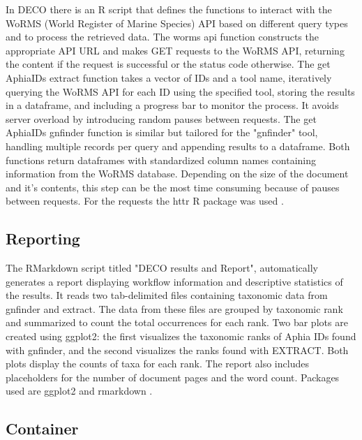 In DECO there is an R script that defines the functions to interact with the WoRMS (World Register of Marine Species)
API based on different query types and to process the retrieved data.
The worms api function constructs the appropriate API URL and makes GET requests
to the WoRMS API, returning the content if the request is successful or the status code otherwise.
The get AphiaIDs extract function takes a vector of IDs and a tool name,
iteratively querying the WoRMS API for each ID using the specified tool,
storing the results in a dataframe, and including a progress bar to monitor the process.
It avoids server overload by introducing random pauses between requests.
The get AphiaIDs gnfinder function is similar but tailored for the "gnfinder" tool,
handling multiple records per query and appending results to a dataframe.
Both functions return dataframes with standardized column names containing information from the WoRMS database.
Depending on the size of the document and it's contents, this step can be the most 
time consuming because of pauses between requests. For the requests the httr R package was used \parencite{httr2023}.


    \subsection{Reporting}
The RMarkdown script titled "DECO results and Report", automatically generates a
report displaying workflow information and descriptive statistics of the results.
It reads two tab-delimited files containing taxonomic data from gnfinder and extract.
The data from these files are grouped by taxonomic rank and summarized to count the total occurrences for each rank.
Two bar plots are created using ggplot2: the first visualizes the taxonomic ranks
of Aphia IDs found with gnfinder, and the second visualizes the ranks found with EXTRACT.
Both plots display the counts of taxa for each rank. The report also includes placeholders
for the number of document pages and the word count.
Packages used are ggplot2 \parencite{wickham_ggplot2_2016} and rmarkdown \parencite{rmarkdown2020}. 

    \subsection{Container}


